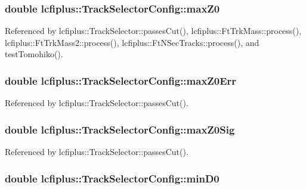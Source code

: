 \subsubsection[{max\-Z0}]{\setlength{\rightskip}{0pt plus 5cm}double lcfiplus\-::\-Track\-Selector\-Config\-::max\-Z0}\label{classlcfiplus_1_1TrackSelectorConfig_a198375709cdb7be2d18240dcf672e6d8}


Referenced by lcfiplus\-::\-Track\-Selector\-::passes\-Cut(), lcfiplus\-::\-Ft\-Trk\-Mass\-::process(), lcfiplus\-::\-Ft\-Trk\-Mass2\-::process(), lcfiplus\-::\-Ft\-N\-Sec\-Tracks\-::process(), and test\-Tomohiko().

\subsubsection[{max\-Z0\-Err}]{\setlength{\rightskip}{0pt plus 5cm}double lcfiplus\-::\-Track\-Selector\-Config\-::max\-Z0\-Err}\label{classlcfiplus_1_1TrackSelectorConfig_ac160a463fafb57e0720e5a1ff142db4d}


Referenced by lcfiplus\-::\-Track\-Selector\-::passes\-Cut().

\subsubsection[{max\-Z0\-Sig}]{\setlength{\rightskip}{0pt plus 5cm}double lcfiplus\-::\-Track\-Selector\-Config\-::max\-Z0\-Sig}\label{classlcfiplus_1_1TrackSelectorConfig_af45368c9ac28274aeb00506b662e6462}


Referenced by lcfiplus\-::\-Track\-Selector\-::passes\-Cut().

\subsubsection[{min\-D0}]{\setlength{\rightskip}{0pt plus 5cm}double lcfiplus\-::\-Track\-Selector\-Config\-::min\-D0}\label{classlcfiplus_1_1TrackSelectorConfig_a7ea0ddf9f5ed2a666914533cfc885231}



